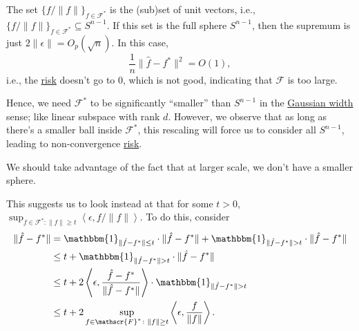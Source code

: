 \begin{note}
	The set \(\{ f / \lVert f \rVert \} _{f\in \mathscr{F} ^{\ast} }\) is the (sub)set of unit vectors, i.e., \(\{ f / \lVert f \rVert \} _{f\in \mathscr{F} ^{\ast} } \subseteq S^{n-1}\). If this set is the full sphere \(S^{n-1}\), then the supremum is just \(2 \lVert \epsilon \rVert = O_p (\sqrt{n} )\). In this case,
	\[
		\frac{1}{n} \lVert \hat{f} - f^{\ast}  \rVert ^2 = O(1),
	\]
	i.e., the \hyperref[not:risk]{risk} doesn't go to \(0\), which is not good, indicating that \(\mathscr{F} \) is too large.
\end{note}

Hence, we need \(\mathscr{F} ^{\ast} \) to be significantly ``smaller'' than \(S^{n-1}\) in the \hyperref[def:Gaussian-width]{Gaussian width} sense; like linear subspace with rank \(d\). However, we observe that as long as there's a smaller ball inside \(\mathscr{F} ^{\ast} \), this rescaling will force us to consider all \(S^{n-1}\), leading to non-convergence \hyperref[not:risk]{risk}.

\begin{center}
\end{center}

\begin{intuition}
	We should take advantage of the fact that at larger scale, we don't have a smaller sphere.
\end{intuition}

This suggests us to look instead at that for some \(t > 0\), \(\sup _{f\in \mathscr{F} ^{\ast} \colon \lVert f \rVert \geq t} \left\langle \epsilon , f / \lVert f \rVert \right\rangle \). To do this, consider
\[
	\begin{split}
		\lVert \hat{f} - f^{\ast} \rVert
		 & = \mathbbm{1}_{\lVert \hat{f} - f^{\ast} \rVert \leq t} \cdot \lVert \hat{f} - f^{\ast} \rVert + \mathbbm{1}_{\lVert \hat{f} - f^{\ast} \rVert > t} \cdot \lVert \hat{f} - f^{\ast} \rVert \\
		 & \leq t + \mathbbm{1}_{\lVert \hat{f} - f^{\ast} \rVert > t} \cdot \lVert \hat{f} - f^{\ast} \rVert                                                                                         \\
		 & \leq t + 2 \left\langle \epsilon , \frac{\hat{f} - f^{\ast} }{\lVert \hat{f} - f^{\ast} \rVert } \right\rangle \cdot \mathbbm{1}_{\lVert \hat{f} - f^{\ast} \rVert > t}                    \\
		 & \leq t + 2 \sup _{\substack{f \in\mathscr{F} ^{\ast} \colon \lVert f \rVert \geq t}} \left\langle \epsilon , \frac{f}{\lVert f \rVert } \right\rangle .
	\end{split}
\]

